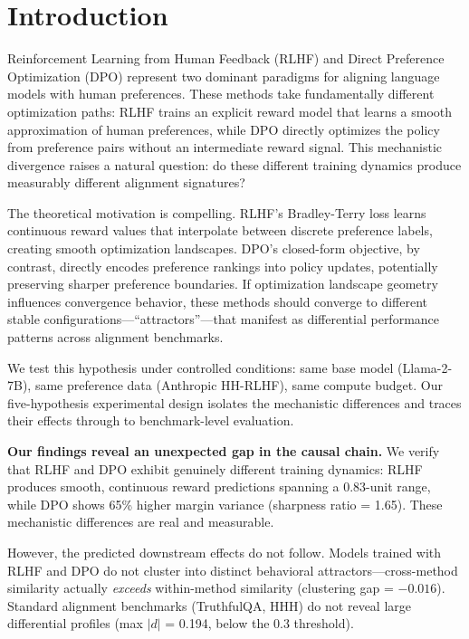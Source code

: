 \section{Introduction}

Reinforcement Learning from Human Feedback (RLHF) and Direct Preference Optimization (DPO) represent two dominant paradigms for aligning language models with human preferences. These methods take fundamentally different optimization paths: RLHF trains an explicit reward model that learns a smooth approximation of human preferences, while DPO directly optimizes the policy from preference pairs without an intermediate reward signal. This mechanistic divergence raises a natural question: do these different training dynamics produce measurably different alignment signatures?

The theoretical motivation is compelling. RLHF's Bradley-Terry loss learns continuous reward values that interpolate between discrete preference labels, creating smooth optimization landscapes. DPO's closed-form objective, by contrast, directly encodes preference rankings into policy updates, potentially preserving sharper preference boundaries. If optimization landscape geometry influences convergence behavior, these methods should converge to different stable configurations---``attractors''---that manifest as differential performance patterns across alignment benchmarks.

We test this hypothesis under controlled conditions: same base model (Llama-2-7B), same preference data (Anthropic HH-RLHF), same compute budget. Our five-hypothesis experimental design isolates the mechanistic differences and traces their effects through to benchmark-level evaluation.

\textbf{Our findings reveal an unexpected gap in the causal chain.} We verify that RLHF and DPO exhibit genuinely different training dynamics: RLHF produces smooth, continuous reward predictions spanning a 0.83-unit range, while DPO shows 65\% higher margin variance (sharpness ratio = 1.65). These mechanistic differences are real and measurable.

However, the predicted downstream effects do not follow. Models trained with RLHF and DPO do not cluster into distinct behavioral attractors---cross-method similarity actually \textit{exceeds} within-method similarity (clustering gap = $-0.016$). Standard alignment benchmarks (TruthfulQA, HHH) do not reveal large differential profiles (max $|d|$ = 0.194, below the 0.3 threshold).

